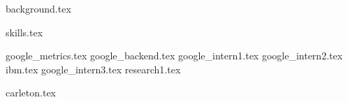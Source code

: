 \documentclass[11pt]{article}
\begin{document}
{background.tex}

\vspace{1mm}
{skills.tex}


{google_metrics.tex}
\vspace{1mm}
{google_backend.tex}
\vspace{1mm}
{google_intern1.tex}
\vspace{1mm}
{google_intern2.tex}
\vspace{1mm}
{ibm.tex}
\vspace{1mm}
{google_intern3.tex}
\vspace{1mm}
{research1.tex}




{carleton.tex}


\end{document}
